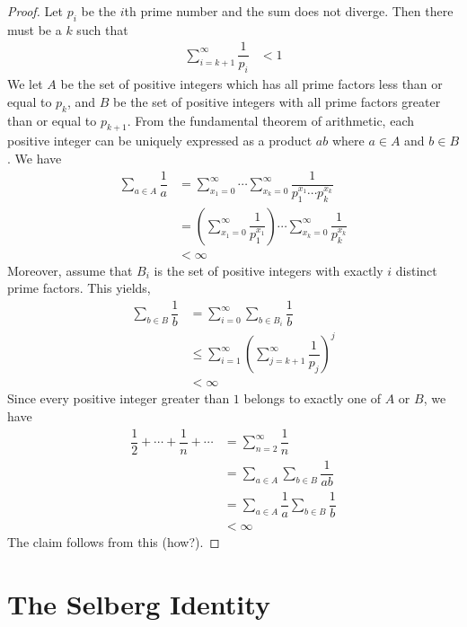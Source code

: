 	\begin{proof}
		Let $p_i$ be the $i$th prime number and the sum does not diverge. Then there must be a $k$ such that
			\begin{align*}
				\sum_{i=k+1}^{\infty}\dfrac{1}{p_i} & < 1
			\end{align*}
		We let $A$ be the set of positive integers which has all prime factors less than or equal to $p_k$, and $B$ be the set of positive integers with all prime factors greater than or equal to $p_{k+1}$. From the fundamental theorem of arithmetic, each positive integer can be uniquely expressed as a product $ab$ where $a\in A$ and $b\in B$. We have
			\begin{align*}
				\sum_{a\in A}\dfrac{1}{a}
					& =
					\sum_{x_1=0}^{\infty}\cdots\sum_{x_k=0}^{\infty}\dfrac{1}{p_1^{x_1}\cdots p_k^{x_k}}\\
					& =
					\left(\sum_{x_1=0}^{\infty}\dfrac{1}{p_1^{x_1}}\right)\cdots\sum_{x_k=0}^{\infty}\dfrac{1}{p_k^{x_k}}\\
					& < \infty
			\end{align*}
		Moreover, assume that $B_i$ is the set of positive integers with exactly $i$ distinct prime factors. This yields,
			\begin{align*}
				\sum_{b\in B}\dfrac{1}{b}
					& =
					\sum_{i=0}^{\infty}\sum_{b\in B_i}\dfrac{1}{b}\\
					& \leq \sum_{i=1}^{\infty}\left(\sum_{j=k+1}^{\infty}\dfrac{1}{p_{j}}\right)^j\\
					& <\infty
			\end{align*}
		Since every positive integer greater than $1$ belongs to exactly one of $A$ or $B$, we have
			\begin{align*}
				\dfrac{1}{2}+\cdots+\dfrac{1}{n}+\cdots
					& = \sum_{n=2}^{\infty}\dfrac{1}{n}\\
					& = \sum_{a\in A}\sum_{b\in B}\dfrac{1}{ab}\\
					& = \sum_{a\in A}\dfrac{1}{a}\sum_{b\in B}\dfrac{1}{b}\\
					& < \infty
			\end{align*}
		The claim follows from this (how?).

	\end{proof}

\section{The Selberg Identity}
	
